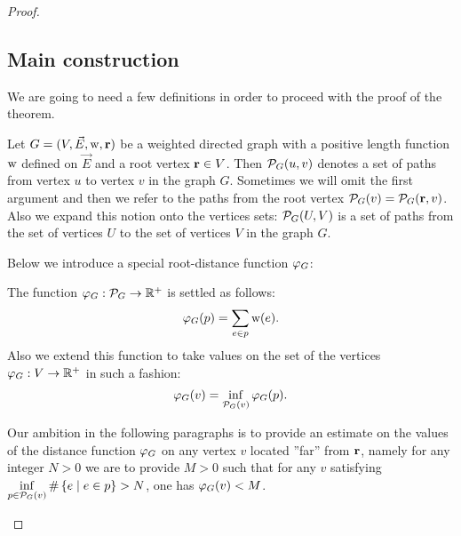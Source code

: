 \documentclass[12pt]{amsart}
\begin{document}
\begin{proof}
      \subsection{Main construction}
      We are going to need a few definitions in order to proceed with the proof of the theorem.
      \begin{definition}
        Let $G = (V, \vec{E},\mathrm{w}, \mathbf{r})$ be a weighted directed graph with a positive
          length function $\mathrm{w}$ defined on $\vec{E}$ and a root vertex $\mathbf{r} \in V$.
        Then $\mathcal{P}_{G}(u, v)$ denotes a set of paths from vertex $u$ to vertex $v$ in the graph $G$.
        Sometimes we will omit the first argument and then we refer to the paths from the root vertex
          $\mathcal{P}_{G}(v) = \mathcal{P}_{G}(\mathbf{r}, v)$.
        Also we expand this notion onto the vertices sets: $\mathcal{P}_{G}(U,V)$ is a set of paths
          from the set of vertices $U$ to the set of vertices $V$ in the graph $G$.
      \end{definition}
      Below we introduce a special root-distance function $\varphi_{G}$:
      \begin{definition}
        The function $\varphi_{G}: \mathcal{P}_{G} \to \mathbb{R}^{+}$ is settled as follows:
        \[
          \varphi_{G}(p) = \sum_{e \in p} \mathrm{w}(e).
        \]
        Also we extend this function to take values on the set of the vertices $\varphi_{G}: V \to \mathbb{R}^{+}$ in such a fashion:
        \[
          \varphi_{G}(v) = \inf_{\mathcal{P}_{G}(v)} \varphi_{G}(p).
        \]
      \end{definition}
      \begin{remark}

        Our ambition in the following paragraphs is to provide an estimate on the values of the distance function $\varphi_{G}$ on any vertex $v$
          located ''far'' from $\mathbf{r}$, namely for any integer $N > 0$ we are to provide $M > 0$ such that
          for any $v$ satisfying $\displaystyle\inf_{p \in \mathcal{P}_{G}(v)} \#\left\{ e \mid e \in p\right\} > N$, one has $\varphi_{G}(v) < M$.
      \end{remark}


\end{proof}
\end{document}
